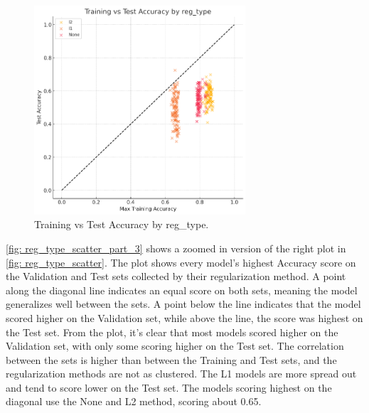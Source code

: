 \begin{figure}[H]
    \centering
    \includegraphics[width=0.7\textwidth]{Figures/results/scatter_reg_type_part_2.png}
    \caption{Training vs Test Accuracy by reg\_type.}
    \label{fig: reg_type_scatter_part_2}
\end{figure}

\autoref{fig: reg_type_scatter_part_3} shows a zoomed in version of the right plot in \autoref{fig: reg_type_scatter}. The plot shows every model's highest Accuracy score on the Validation and Test sets collected by their regularization method. A point along the diagonal line indicates an equal score on both sets, meaning the model generalizes well between the sets. A point below the line indicates that the model scored higher on the Validation set, while above the line, the score was highest on the Test set. From the plot, it's clear that most models scored higher on the Validation set, with only some scoring higher on the Test set. The correlation between the sets is higher than between the Training and Test sets, and the regularization methods are not as clustered. The L1 models are more spread out and tend to score lower on the Test set. The models scoring highest on the diagonal use the None and L2 method, scoring about 0.65.

